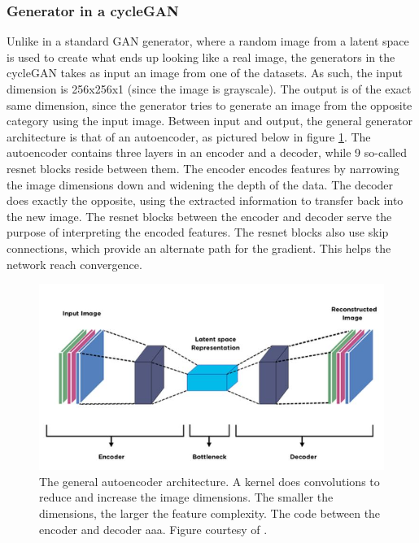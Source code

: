 \documentclass[12pt, fleqn, titlepage]{article}
\begin{document}

\subsubsection{Generator in a cycleGAN}
Unlike in a standard GAN generator, where a random image from a latent space is used to create what ends up looking like a real image, the generators in the cycleGAN takes as input an image from one of the datasets. As such, the input dimension is 256x256x1 (since the image is grayscale). The output is of the exact same dimension, since the generator tries to generate an image from the opposite category using the input image. Between input and output, the general generator architecture is that of an autoencoder, as pictured below in figure \ref{fig:autoencoder}. The autoencoder contains three layers in an encoder and a decoder, while 9 so-called resnet blocks reside between them. The encoder encodes features by narrowing the image dimensions down and widening the depth of the data. The decoder does exactly the opposite, using the extracted information to transfer back into the new image. The resnet blocks between the encoder and decoder serve the purpose of interpreting the encoded features. The resnet blocks also use skip connections, which provide an alternate path for the gradient. This helps the network reach convergence.

\begin{figure}[H]
	\centering
	\includegraphics[width=0.7\linewidth]{imgs/autoencoder}
	\caption{The general autoencoder architecture. A kernel does convolutions to reduce and increase the image dimensions. The smaller the dimensions, the larger the feature complexity. The code between the encoder and decoder aaa. Figure courtesy of \cite{autoencoder}.} %
	\label{fig:autoencoder}
\end{figure}
\end{document}
